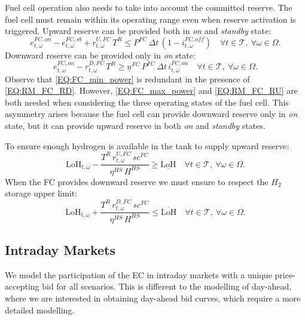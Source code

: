 \documentclass{article}
\begin{document}
Fuel cell operation also needs to take into account the committed reserve. The
fuel cell must remain within its operating range even when reserve activation is
triggered. Upward reserve can be provided both in \emph{on} and \emph{standby}
state:
\begin{equation} \label{EQ:RM_FC_RU}
    e^{FC,on}_{t,\omega} - e^{FC,sb}_{t,\omega} + r^{U, FC}_{t, \omega}\, T^R
    \leq P^{FC}\, \Delta t\, (1 - i^{FC,off}_{t,\omega})
    \quad \forall t \in \mathcal{T},\ \forall \omega \in \Omega.
\end{equation}
Downward reserve can be provided only in \emph{on} state:
\begin{equation} \label{EQ:RM_FC_RD}
    e^{FC,on}_{t,\omega} - r^{D, FC}_{t, \omega}\, T^R
    \geq \underline{u}^{FC}\, P^{FC}\, \Delta t\, i^{FC,on}_{t,\omega}
    \quad \forall t \in \mathcal{T},\ \forall \omega \in \Omega.
\end{equation}
Observe that \eqref{EQ:FC_min_power} is redundant in the presence of
\eqref{EQ:RM_FC_RD}. However, \eqref{EQ:FC_max_power} and \eqref{EQ:RM_FC_RU}
are both needed when considering the three operating states of the fuel cell.
This asymmetry arises because the fuel cell can provide downward reserve only
in \emph{on} state, but it can provide upward reserve in both \emph{on} and
\emph{standby} states.

To ensure enough hydrogen is available in the tank to supply upward reserve:
\begin{equation} \label{EQ:RM_FC_RU_LOH}
    \text{LoH}_{t,\omega}
    - \frac{T^R\, r^{U, FC}_{t,\omega}\, sc^{FC}}{\eta^{HS}\, H^{HS}}
    \geq \underline{\text{LoH}}
    \quad \forall t \in \mathcal{T},\ \forall \omega \in \Omega.
\end{equation}
When the FC provides downward reserve we must ensure to respect the $H_{2}$
storage upper limit:
\begin{equation} \label{EQ:RM_FC_RD_LOH}
    \text{LoH}_{t,\omega}
    + \frac{T^R\, r^{D, FC}_{t,\omega}\, sc^{FC}}{\eta^{HS}\, H^{HS}}
    \leq \overline{\text{LoH}}
    \quad \forall t \in \mathcal{T},\ \forall \omega \in \Omega.
\end{equation}

\subsection{Intraday Markets}

We model the participation of the EC in intraday markets with a unique price-accepting bid for all scenarios. This is different to the modelling of day-ahead, where we are interested in obtaining day-ahead bid curves, which require a more detailed modelling.
\end{document}
